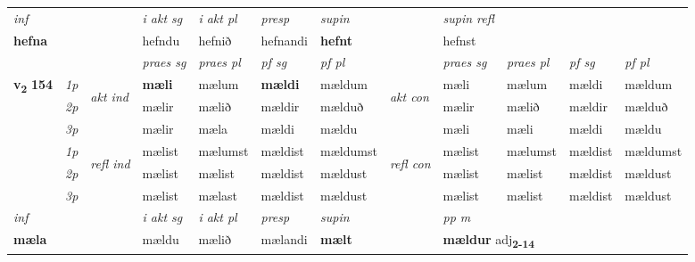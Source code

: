 \begin{longtable}[l]{X>{\footnotesize\itshape}llXXXXlXXXX}
\cmidrule{4-7}
   {\textit{inf}} & &  & \textit{i akt sg} & \textit{i akt pl}   & \textit{presp} & \textit{supin} && \textit{supin refl}  \\*
  {\textbf{hefna}} & && hefndu  & hefnið   & hefnandi &  \textbf{hefnt} && hefnst  \\*

\midrule

 & &   & \textit{praes sg}  & \textit{praes pl}    & \textit{ pf sg} & \textit{pf pl} & & \textit{praes sg}  & \textit{praes pl}    & \textit{pf sg} & \textit{pf pl }  \\ \cmidrule{4-7} \cmidrule{9-12}
 \multirow{2}{*}{{{\textbf{v{\textsubscript{2}}} \Large{\textbf{154}}}}}  & 1p & \multirow{3}{*}{\begin{turn}{90}\textit{akt ind}\end{turn}} & \textbf{mæli} & mælum & \textbf{mældi} & mældum & \multirow{3}{*}{\begin{turn}{90}\textit{akt con}\end{turn}} &mæli & mælum & mældi & mældum\\*
 & 2p &  &  mælir  & mælið & mældir & mælduð & & mælir & mælið & mældir & mælduð \\*
 & 3p &  & mælir & mæla & mældi & mældu & & mæli & mæli& mældi & mældu \\*
\cmidrule{4-7} \cmidrule{9-12}
 & 1p & \multirow{3}{*}{\begin{turn}{90}\textit{refl ind}\end{turn}}  & mælist & mælumst & mældist & mældumst & \multirow{3}{*}{\begin{turn}{90}\textit{refl con}\end{turn}}  &mælist & mælumst & mældist & mældumst \\*
 & 2p &  & mælist & mælist & mældist & mældust & &mælist & mælist & mældist & mældust \\*
 & 3p  & & mælist & mælast & mældist & mældust & & mælist & mælist& mældist & mældust \\*
\cmidrule{4-7} \cmidrule{9-12}

   {\textit{inf}} & &  & \textit{i akt sg} & \textit{i akt pl}   & \textit{presp} & \textit{supin}  && \textit{pp m} \\*
  {\textbf{mæla}} & && mældu  & mælið   & mælandi &  \textbf{mælt}  && \multicolumn{2}{l}{\textbf{mældur} adj\textbf{\textsubscript{2-14}}} \\*

\midrule


\end{longtable}
